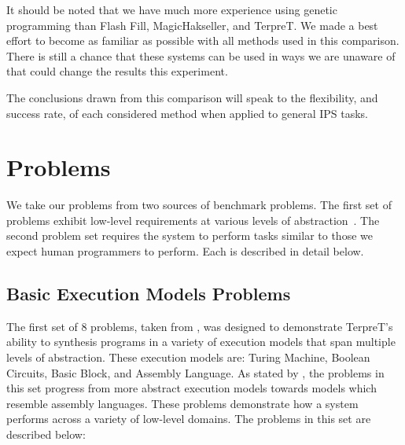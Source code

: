 It should be noted that we have much more experience using genetic programming than Flash Fill, MagicHakseller, and TerpreT. We made a best effort to become as familiar as possible with all methods used in this comparison. There is still a chance that these systems can be used in ways we are unaware of that could change the results this experiment.

The conclusions drawn from this comparison will speak to the flexibility, and success rate, of each considered method when applied to general IPS tasks.

\section{Problems}

We take our problems from two sources of benchmark problems. The first set of problems exhibit low-level requirements at various levels of abstraction~\cite{Gaunt2016}. The second problem set requires the system to perform tasks similar to those we expect human programmers to perform\cite{Helmuth2015b}. Each is described in detail below.

\subsection{Basic Execution Models Problems}

The first set of 8 problems, taken from \cite{Gaunt2016}, was designed to demonstrate TerpreT's ability to synthesis programs in a variety of execution models that span multiple levels of abstraction. These execution models are: Turing Machine, Boolean Circuits, Basic Block, and Assembly Language. As stated by \cite{Gaunt2016}, the problems in this set progress from more abstract execution models towards models which resemble assembly languages. These problems demonstrate how a system performs across a variety of low-level domains. 
The problems in this set are described below:



